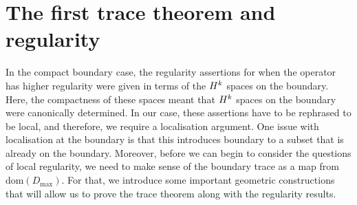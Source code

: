 \documentclass[a4paper,10pt,reqno]{amsart}
\newcommand{\Hard}[2][{}]{{\rm H}^{#2}_{\rm #1}}%
\newcommand{\SobH}[2][{}]{\Hard[#1]{\rm #2}}
\newcommand{\dom}{\mathrm{dom}}
\theoremstyle{definition}
\begin{document}
\section{The first trace theorem and regularity}


In the compact boundary case, the regularity assertions for when the operator has higher regularity were given in terms of the $\SobH{k}$ spaces on the boundary.
Here, the compactness of these spaces meant that $\SobH{k}$ spaces on the boundary were canonically determined.
In our case, these assertions have to be rephrased to be local, and therefore, we require a localisation argument.
One issue with localisation at the boundary is that this introduces boundary to a subset that is already on the boundary.
Moreover, before we can begin to consider the questions of local regularity, we need to make sense of the boundary trace as a map from $\dom(D_{\max})$. For that, we introduce some important geometric constructions that will allow us to prove the trace theorem along with the regularity results.
\end{document}
